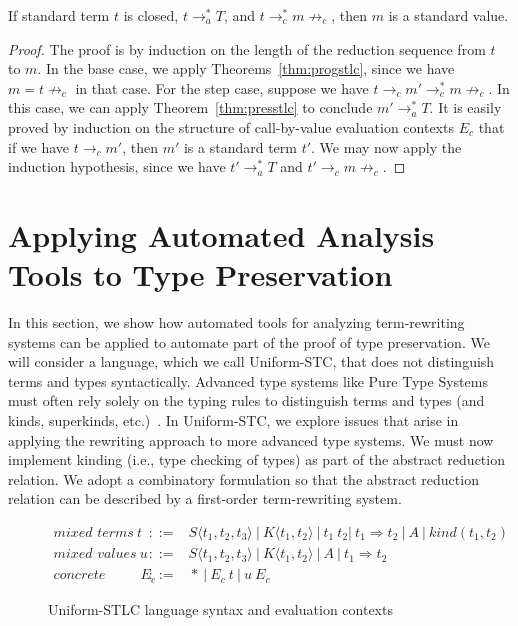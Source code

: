 \documentclass{LMCS}
\newcommand{\To}[0]{\Rightarrow}
\begin{document}
\begin{thm}
\label{thm:safety}
If standard term $t$ is closed, $t\to_a^* T$, and $t\to_c^*
m\not\to_c$, then $m$ is a standard value.
\end{thm}
\begin{proof} The proof is by induction on the length of the reduction
sequence from $t$ to $m$.  In the base case, we apply
Theorems~\ref{thm:progstlc}, since we have $m = t\not\to_c$ in that
case.  For the step case, suppose we have $t\to_c m'\to_c^*
m\not\to_c$.  In this case, we can apply Theorem~\ref{thm:presstlc} to
conclude $m'\to_a^*T$.  It is easily proved by induction on the
structure of call-by-value evaluation contexts $E_c$ that if we have
$t\to_c m'$, then $m'$ is a standard term $t'$.  We may now apply the
induction hypothesis, since we have $t'\to_a^*T$ and $t'\to_c
m\not\to_c$. \end{proof}

\section{Applying Automated Analysis Tools to Type Preservation}
\label{sec:unistc}

In this section, we show how automated tools for analyzing
term-rewriting systems can be applied to automate part of the proof of
type preservation.  We will consider a language, which we call
Uniform-STC, that does not distinguish terms and types syntactically.
Advanced type systems like Pure Type Systems must often rely solely on
the typing rules to distinguish terms and types (and kinds,
superkinds, etc.)~\cite{B92}.  In Uniform-STC, we explore issues that
arise in applying the rewriting approach to more advanced type
systems.  We must now implement kinding (i.e., type checking of types)
as part of the abstract reduction relation.  We adopt a combinatory
formulation so that the abstract reduction relation can be described
by a first-order term-rewriting system.

\begin{figure}[t]
  \centering
\[
\begin{array}{lll}
  \textit{mixed terms}\ t\!&\!\!::=\!\!&\!\!S\langle
  t_1,t_2,t_3\rangle\ |\ K\langle t_1,t_2\rangle\ |\ t_1\ t_2
  |\ t_1\To t_2\ |\ A\ |\ \textit{kind}(t_1,t_2)\\
  \textit{mixed values}\ u\!&\!\!::=\!\!&\!\!S\langle t_1,t_2,t_3 \rangle\ |\ K\langle t_1,t_2\rangle\ |\ A\ |\ t_1\To t_2  \\
  \textit{concrete evaluation contexts}\ E_c\!&\!\!::=\!\!&\!\!*\ |\ E_c\ t\ |\ u\ E_c
\end{array}
\]
  \caption{Uniform-STLC language syntax and evaluation contexts}
  \label{fig:unified-syntax}
\end{figure}
\end{document}
